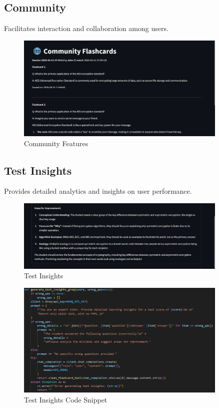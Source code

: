 \documentclass{report}
\begin{document}
\subsection{Community}
Facilitates interaction and collaboration among users.
\begin{figure}[H]
\centering
\includegraphics[width=0.9\textwidth]{community.png}
\caption{Community Features}
\end{figure}

\subsection{Test Insights}
Provides detailed analytics and insights on user performance.
\begin{figure}[H]
\centering
\includegraphics[width=0.9\textwidth]{test-insights.png}
\caption{Test Insights}
\end{figure}
\begin{figure}[H]
\centering
\includegraphics[width=0.9\textwidth]{test-insights-code.png}
\caption{Test Insights Code Snippet}
\end{figure}
\end{document}
